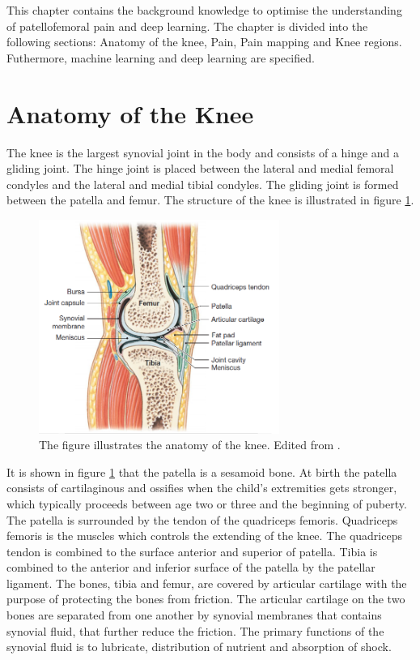 This chapter contains the background knowledge to optimise the understanding of patellofemoral pain and deep learning. The chapter is divided into the following sections: Anatomy of the knee, Pain, Pain mapping and Knee regions. Futhermore, machine learning and deep learning are specified.


\section{Anatomy of the Knee}
The knee is the largest synovial joint in the body and consists of a hinge and a gliding joint. The hinge joint is placed between the lateral and medial femoral condyles and the lateral and medial tibial condyles. The gliding joint is formed between the patella and femur. The structure of the knee is illustrated in figure \ref{fig:bonestruc}.\citep{Martini2012}

\begin{figure} [H]
\centering
\includegraphics[width=0.7\textwidth]{figures/bonestruc}
\caption{The figure illustrates the anatomy of the knee. Edited from \citep{Martini2012}.}
\label{fig:bonestruc}
\end{figure}

\noindent
It is shown in figure \ref{fig:bonestruc} that the patella is a sesamoid bone. At birth the patella consists of cartilaginous and ossifies when the child’s extremities gets stronger, which typically proceeds between age two or three and the beginning of puberty. \\
\noindent
The patella is surrounded by the tendon of the quadriceps femoris. Quadriceps femoris is the muscles which controls the extending of the knee. The quadriceps tendon is combined to the surface anterior and superior of patella. Tibia is combined to the anterior and inferior surface of the patella by the patellar ligament. The bones, tibia and femur, are covered by articular cartilage with the purpose of protecting the bones from friction. The articular cartilage on the two bones are separated from one another by synovial membranes that contains synovial fluid, that further reduce the friction. The primary functions of the synovial fluid is to lubricate, distribution of nutrient and absorption of shock.\citep{Martini2012}

